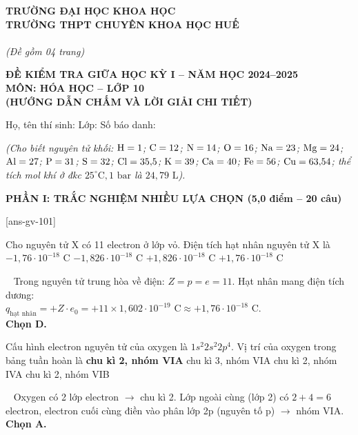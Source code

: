 \documentclass[12pt,a4paper]{article}
\renewcommand{\loigiai}[1]{%
  \par\smallskip\noindent{\color{blue!80!black}\textbf{Lời giải:}}\ #1\par\smallskip
}
\renewcommand{\True}{\bfseries\color{red!80!black}}
\begin{document}
\thispagestyle{firstpage}

\noindent
\begin{minipage}[t]{0.44\textwidth}
	\centering\fontsize{10pt}{12pt}\selectfont
	\textbf{TRƯỜNG ĐẠI HỌC KHOA HỌC}\\
	\textbf{TRƯỜNG THPT CHUYÊN KHOA HỌC HUẾ}\\
	\\
	\textit{(Đề gồm 04 trang)}
\end{minipage}\hfill
\begin{minipage}[t]{0.54\textwidth}
	\centering\small
	\textbf{ĐỀ KIỂM TRA GIỮA HỌC KỲ I -- NĂM HỌC 2024--2025}\\
	\textbf{MÔN: HÓA HỌC -- LỚP 10}\\
	\textbf{\color{red!80!black}(HƯỚNG DẪN CHẤM VÀ LỜI GIẢI CHI TIẾT)}
\end{minipage}

\smallskip
\noindent
Họ, tên thí sinh: \dotfill Lớp: \makebox[2.5cm]{\dotfill} Số báo danh: \makebox[2.5cm]{\dotfill}

\smallskip
\noindent
\textit{(Cho biết nguyên tử khối: $\ce{H}=1$; $\ce{C}=12$; $\ce{N}=14$; $\ce{O}=16$; $\ce{Na}=23$; $\ce{Mg}=24$; $\ce{Al}=27$; $\ce{P}=31$; $\ce{S}=32$; $\ce{Cl}=35{,}5$; $\ce{K}=39$; $\ce{Ca}=40$; $\ce{Fe}=56$; $\ce{Cu}=63{,}54$; thể tích mol khí ở đkc $25^\circ\text{C}, 1\text{ bar}$ là $24{,}79\text{ L}$).}

\smallskip
\noindent
\textbf{PHẦN I: TRẮC NGHIỆM NHIỀU LỰA CHỌN (5,0 điểm -- 20 câu)}

[ans-gv-101]

\begin{ex}
Cho nguyên tử X có 11 electron ở lớp vỏ. Điện tích hạt nhân nguyên tử X là
\choice
{$-1{,}76 \cdot 10^{-18}\text{ C}$}
{$-1{,}826 \cdot 10^{-18}\text{ C}$}
{$+1{,}826 \cdot 10^{-18}\text{ C}$}
{\True $+1{,}76 \cdot 10^{-18}\text{ C}$}
\loigiai{
Trong nguyên tử trung hòa về điện: $Z = p = e = 11$. Hạt nhân mang điện tích dương:\\
$q_{\text{hạt nhân}} = +Z \cdot e_0 = +11 \times 1{,}602 \cdot 10^{-19}\text{ C} \approx +1{,}76 \cdot 10^{-18}\text{ C}$.\\
\textbf{Chọn D.}
}
\end{ex}

\begin{ex}
Cấu hình electron nguyên tử của oxygen là $1s^2 2s^2 2p^4$. Vị trí của oxygen trong bảng tuần hoàn là
\choice
{\True chu kì 2, nhóm VIA}
{chu kì 3, nhóm VIA}
{chu kì 2, nhóm IVA}
{chu kì 2, nhóm VIB}
\loigiai{
Oxygen có 2 lớp electron $\rightarrow$ chu kì 2. Lớp ngoài cùng (lớp 2) có $2 + 4 = 6$ electron, electron cuối cùng điền vào phân lớp 2p (nguyên tố p) $\rightarrow$ nhóm VIA.\\
\textbf{Chọn A.}
}
\end{ex}
\end{document}
